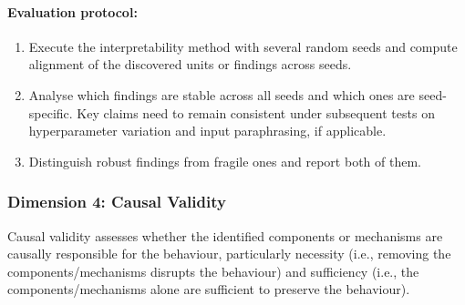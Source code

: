 \paragraph{Evaluation protocol:}
\begin{enumerate}
\item Execute the interpretability method with several random seeds and compute alignment of the discovered units or findings across seeds.
\item Analyse which findings are stable across all seeds and which ones are seed-specific. Key claims need to remain consistent under subsequent tests on hyperparameter variation and input paraphrasing, if applicable.
\item Distinguish robust findings from fragile ones and report both of them.
\end{enumerate}

\subsubsection*{Dimension 4: Causal Validity}

Causal validity assesses whether the identified components or mechanisms are causally responsible for the behaviour, particularly necessity (i.e., removing the components/mechanisms disrupts the behaviour) and sufficiency (i.e., the components/mechanisms alone are sufficient to preserve the behaviour).

